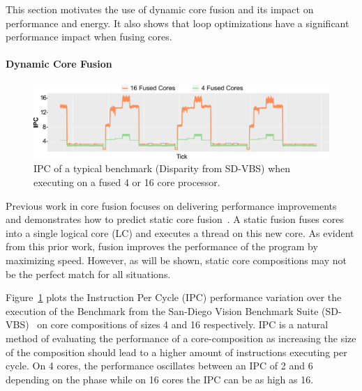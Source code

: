 This section motivates the use of dynamic core fusion and its impact on performance and energy.
It also shows that loop optimizations have a significant performance impact when fusing cores.

\paragraph{Dynamic Core Fusion}
\begin{figure}[t]
    \centering
    \includegraphics[width=\textwidth]{cases-paper/graphics/motivation/disp_opt_4_16_3.pdf}
    \caption{IPC of a typical benchmark (Disparity from SD-VBS) when executing on a fused 4 or 16 core processor.} 
    \label{fig:disp_ex}
	\vspace{1em}
\end{figure}

Previous work in core fusion focuses on delivering performance improvements~\cite{ipek2007CoreFusion,kim2007tflex} and demonstrates how to predict static core fusion~\cite{micolet2016dmpstream}.
A static fusion fuses cores into a single logical core (LC) and executes a thread on this new core.
As evident from this prior work, fusion improves the performance of the program by maximizing speed.
However, as will be shown, static core compositions may not be the perfect match for all situations.

Figure~\ref{fig:disp_ex} plots the Instruction Per Cycle (IPC) performance variation over the execution of the  Benchmark from the San-Diego Vision Benchmark Suite (SD-VBS)~\cite{sdvbs} on core compositions of sizes 4 and 16 respectively.
IPC is a natural method of evaluating the performance of a core-composition as increasing the size of the composition should lead to a higher amount of instructions executing per cycle.
On 4 cores, the performance oscillates between an IPC of 2 and 6 depending on the phase while on 16 cores the IPC can be as high as 16.

